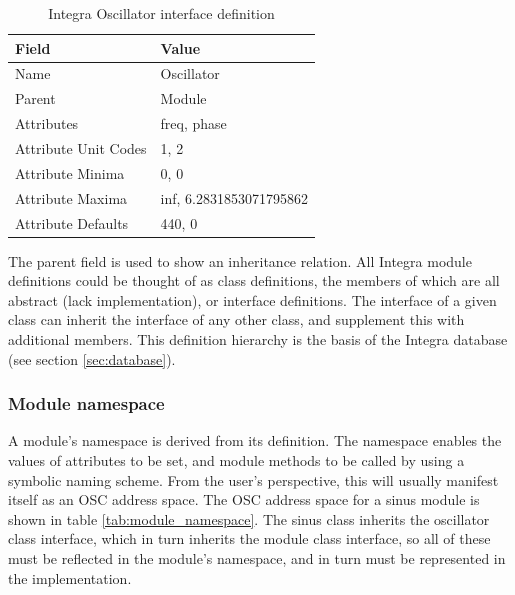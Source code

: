 \documentclass{article}
\begin{document}
\begin{table}
\begin{center}
\begin{tabular}{|l|l|}
\hline
\textbf{Field} & \textbf{Value} \\
\hline
Name  & Oscillator \\
\hline
Parent  & Module \\
\hline
Attributes & freq, phase \\
\hline
Attribute Unit Codes & 1, 2 \\
\hline
Attribute Minima & 0, 0 \\
\hline
Attribute Maxima & inf, 6.2831853071795862 \\
\hline
Attribute Defaults & 440, 0 \\
\hline
\end{tabular} 
\end{center}
\caption{Integra Oscillator interface definition}
\label{tab:module_definition}
\end{table}

The parent field is used to show an inheritance relation. All Integra module definitions could be thought of as class definitions, the members of which are all abstract (lack implementation), or interface definitions. The interface of a given class can inherit the interface of any other class, and supplement this with additional members. This definition hierarchy is the basis of the Integra database (see section \ref{sec:database}). 

\subsubsection{Module namespace}\label{subsubsec:module_namespace}

A module's namespace is derived from its definition. The namespace enables the values of attributes to be set, and module methods to be called  by using a symbolic naming scheme.  From the user's perspective, this will usually manifest itself as an OSC address space. The OSC address space for a sinus module is shown in table \ref{tab:module_namespace}. The sinus class inherits the oscillator class interface, which in turn inherits the module class interface, so all of these must be reflected in the module's namespace, and in turn must be represented in the implementation.
\end{document}
